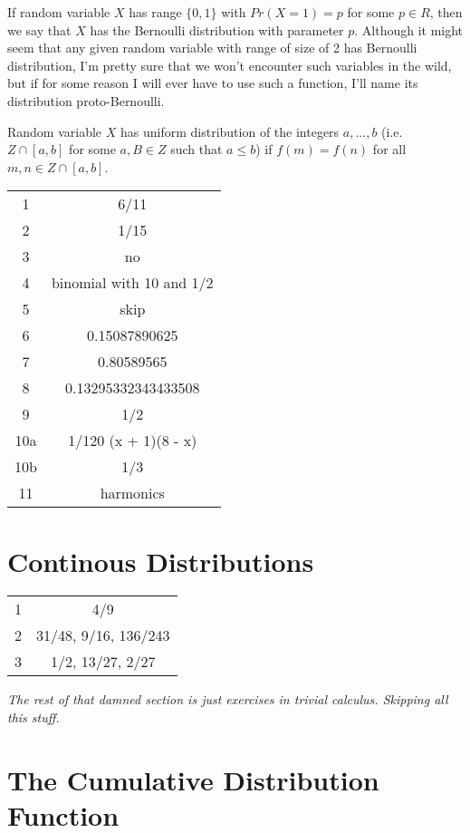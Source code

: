 \documentclass[11pt,oneside,titlepage]{book}
\newcommand{\set}[1]{\{ #1 \}}
\begin{document}
If random variable $X$ has range $\set{0, 1}$ with $Pr(X = 1) = p$ for some $p \in R$, then we say
that $X$ has the Bernoulli distribution with parameter $p$. Although it might seem that
any given random variable with range of size of 2 has Bernoulli distribution, I'm
pretty sure that we won't encounter such variables in the wild, but if for some reason
I will ever have to use such a function, I'll name its distribution proto-Bernoulli.

Random variable $X$ has uniform distribution of the integers $a, ..., b$
(i.e. $Z \cap [a, b]$ for some $a, B \in Z$ such that $a \leq b$) if $f(m) = f(n)$ for
all $m, n \in Z \cap [a, b]$. 

\begin{tabular}[center]{||c | c|| }
  \hline
  1 & 6/11 \\
  2 & 1/15 \\
  3 & no \\
  4 & binomial with 10 and 1/2 \\
  5 & skip \\
  6 & 0.15087890625\\
  7 & 0.80589565 \\
  8 & 0.13295332343433508 \\
  9 & 1/2 \\
  10a & 1/120 (x + 1)(8 - x) \\
  10b & 1/3 \\
  11 & harmonics\\
  \hline 
\end{tabular}

\section{Continous Distributions}

\begin{tabular}[center]{||c | c|| }
  \hline
  1 & 4/9 \\
  2 & 31/48, 9/16, 136/243 \\
  3 & 1/2, 13/27, 2/27 \\  
  \hline 
\end{tabular}

\textit{The rest of that damned section is just exercises in trivial calculus. Skipping all
  this stuff.}

\section{The Cumulative Distribution Function}
\end{document}
